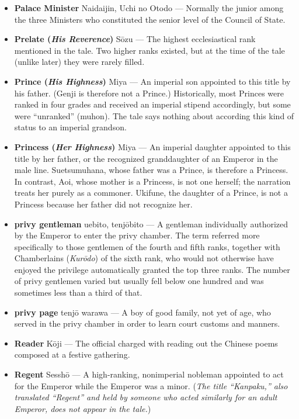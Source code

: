 \documentclass{article}
\begin{document}
\begin{multicols}{2}
\begin{small}
\begin{itemize}[
				label=,
				leftmargin=0em,
				rightmargin=-1.5em,
				itemindent=-2em,
			]
			\item \textbf{Palace Minister} Naidaijin, Uchi no Otodo --- Normally the junior among the three Ministers who constituted the senior level of the Council of State.

			\item \textbf{Prelate (\textit{His Reverence})} Sōzu --- The highest ecclesiastical rank mentioned in the tale. Two higher ranks existed, but at the time of the tale (unlike later) they were rarely filled.

			\item \textbf{Prince (\textit{His Highness})} Miya --- An imperial son appointed to this title by his father. (Genji is therefore not a Prince.) Historically, most Princes were ranked in four grades and received an imperial stipend accordingly, but some were “unranked” (muhon). The tale says nothing about according this kind of status to an imperial grandson.

			\item \textbf{Princess (\textit{Her Highness})} Miya --- An imperial daughter appointed to this title by her father, or the recognized granddaughter of an Emperor in the male line. Suetsumuhana, whose father was a Prince, is therefore a Princess. In contrast, Aoi, whose mother is a Princess, is not one herself; the narration treats her purely as a commoner. Ukifune, the daughter of a Prince, is not a Princess because her father did not recognize her.

			\item \textbf{privy gentleman} uebito, tenjōbito --- A gentleman individually authorized by the Emperor to enter the privy chamber. The term referred more specifically to those gentlemen of the fourth and fifth ranks, together with Chamberlains (\textit{Kurōdo}) of the sixth rank, who would not otherwise have enjoyed the privilege automatically granted the top three ranks. The number of privy gentlemen varied but usually fell below one hundred and was sometimes less than a third of that.

			\item \textbf{privy page} tenjō warawa --- A boy of good family, not yet of age, who served in the privy chamber in order to learn court customs and manners.

			\item \textbf{Reader} Kōji --- The official charged with reading out the Chinese poems composed at a festive gathering.

			\item \textbf{Regent} Sesshō --- A high-ranking, nonimperial nobleman appointed to act for the Emperor while the Emperor was a minor. (\textit{The title “Kanpaku,” also translated “Regent” and held by someone who acted similarly for an adult Emperor, does not appear in the tale.})


\end{itemize}
\end{small}
\end{multicols}
\end{document}
